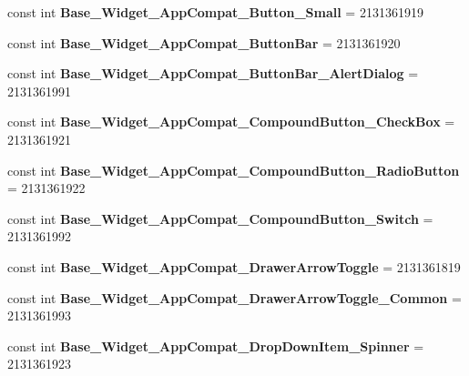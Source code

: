 \begin{DoxyCompactItemize}
const int {\bfseries Base\+\_\+\+Widget\+\_\+\+App\+Compat\+\_\+\+Button\+\_\+\+Small} = 2131361919
\item 
\mbox{\label{classXaria_1_1Resource_1_1Style_afeb0bf5eb193e0ce98907a3810049991}} 
const int {\bfseries Base\+\_\+\+Widget\+\_\+\+App\+Compat\+\_\+\+Button\+Bar} = 2131361920
\item 
\mbox{\label{classXaria_1_1Resource_1_1Style_a65eda45bb61ea88f2d8b76f26b682bde}} 
const int {\bfseries Base\+\_\+\+Widget\+\_\+\+App\+Compat\+\_\+\+Button\+Bar\+\_\+\+Alert\+Dialog} = 2131361991
\item 
\mbox{\label{classXaria_1_1Resource_1_1Style_a2b9a1b1da58b829822a5021deb8e83a1}} 
const int {\bfseries Base\+\_\+\+Widget\+\_\+\+App\+Compat\+\_\+\+Compound\+Button\+\_\+\+Check\+Box} = 2131361921
\item 
\mbox{\label{classXaria_1_1Resource_1_1Style_a0fd102e6bd28076bb3e13b8e41e28f2a}} 
const int {\bfseries Base\+\_\+\+Widget\+\_\+\+App\+Compat\+\_\+\+Compound\+Button\+\_\+\+Radio\+Button} = 2131361922
\item 
\mbox{\label{classXaria_1_1Resource_1_1Style_a2ede7f441a4a125ce93ba31f22c2b4d6}} 
const int {\bfseries Base\+\_\+\+Widget\+\_\+\+App\+Compat\+\_\+\+Compound\+Button\+\_\+\+Switch} = 2131361992
\item 
\mbox{\label{classXaria_1_1Resource_1_1Style_a437ee1803ba3dd46e68c45a06ec67421}} 
const int {\bfseries Base\+\_\+\+Widget\+\_\+\+App\+Compat\+\_\+\+Drawer\+Arrow\+Toggle} = 2131361819
\item 
\mbox{\label{classXaria_1_1Resource_1_1Style_a2baf4b603fb6c813675de81b2239fce7}} 
const int {\bfseries Base\+\_\+\+Widget\+\_\+\+App\+Compat\+\_\+\+Drawer\+Arrow\+Toggle\+\_\+\+Common} = 2131361993
\item 
\mbox{\label{classXaria_1_1Resource_1_1Style_a0d087edb8780b5f7ce01d6d756d1b521}} 
const int {\bfseries Base\+\_\+\+Widget\+\_\+\+App\+Compat\+\_\+\+Drop\+Down\+Item\+\_\+\+Spinner} = 2131361923

\end{DoxyCompactItemize}
